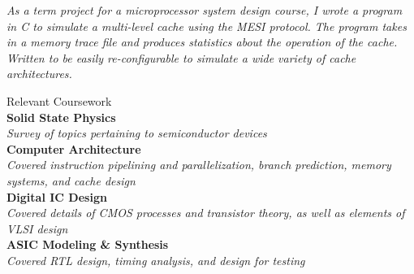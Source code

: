 \documentclass{article}
\newcommand\rightcolwidthvar{0.60}
\begin{document}
\begin{minipage}[t]{\rightcolwidthvar \textwidth}
\begin{flushleft}
\textsf{\textit{%
As a term project for a microprocessor system design course, I wrote a program in C to simulate a multi-level cache using the MESI protocol.  The program takes in a memory trace file and produces statistics about the operation of the cache.  Written to be easily re-configurable to simulate a wide variety of cache architectures.\\}}
\end{flushleft}
%
%
\begin{flushleft}
	\textsf{\Large Relevant Coursework}\\
	\medskip
	\textbf{Solid State Physics\\}
	\textsf{\textit{Survey of topics pertaining to semiconductor devices\\}}\vspace{1pt}
	\textbf{Computer Architecture\\}
	\textsf{\textit{Covered instruction pipelining and parallelization, branch prediction, memory systems, and cache design\\}}\vspace{2pt}
	\textbf{Digital IC Design\\}
	\textsf{\textit{Covered details of CMOS processes and transistor theory, as well as elements of VLSI design\\}}\vspace{2pt}
	\textbf{ASIC Modeling \& Synthesis\\}
	\textsf{\textit{Covered RTL design, timing analysis, and design for testing\\}}\vspace{2pt}
\end{flushleft}
\end{minipage}

\bigskip
\end{document}
